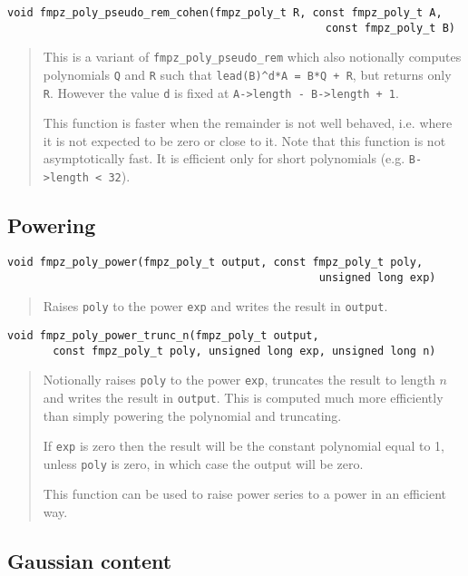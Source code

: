 \documentclass[a4paper,10pt]{article}
\newcommand{\code}{\lstinline}
\begin{document}
\begin{lstlisting}
void fmpz_poly_pseudo_rem_cohen(fmpz_poly_t R, const fmpz_poly_t A,
                                                 const fmpz_poly_t B)
\end{lstlisting}
\begin{quote}
This is a variant of \code{fmpz_poly_pseudo_rem} which also notionally computes polynomials \code{Q} and \code{R} such that \code{lead(B)^d*A = B*Q + R}, but returns only \code{R}. However the value \code{d} is fixed at \code{A->length - B->length + 1}.

This function is faster when the remainder is not well behaved, i.e. where it is not expected to be zero or close to it. Note that this function is not asymptotically fast. It is efficient only for short polynomials (e.g. \code{B->length < 32}).
\end{quote}

\subsection{Powering}

\begin{lstlisting}
void fmpz_poly_power(fmpz_poly_t output, const fmpz_poly_t poly, 
                                                unsigned long exp) 
\end{lstlisting}
\begin{quote}
Raises \code{poly} to the power \code{exp} and writes the result in \code{output}.
\end{quote}

\begin{lstlisting}
void fmpz_poly_power_trunc_n(fmpz_poly_t output, 
       const fmpz_poly_t poly, unsigned long exp, unsigned long n) 
\end{lstlisting}
\begin{quote}
Notionally raises \code{poly} to the power \code{exp}, truncates the result to length $n$ and writes the result in \code{output}. This is computed much more efficiently than simply powering the polynomial and truncating. 

If \code{exp} is zero then the result will be the constant polynomial equal to 1, unless \code{poly} is zero, in which case the output will be zero.

This function can be used to raise power series to a power in an efficient way.
\end{quote}

\subsection{Gaussian content}
\end{document}
